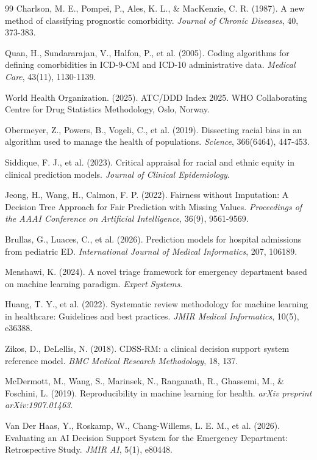 \documentclass[harvard,article]{frontiersinFPHY_FAMS}
\begin{document}
\begin{thebibliography}{99}
 Charlson, M. E., Pompei, P., Ales, K. L., \& MacKenzie, C. R. (1987). A new method of classifying prognostic comorbidity. \textit{Journal of Chronic Diseases}, 40, 373-383.

 Quan, H., Sundararajan, V., Halfon, P., et al. (2005). Coding algorithms for defining comorbidities in ICD-9-CM and ICD-10 administrative data. \textit{Medical Care}, 43(11), 1130-1139.

 World Health Organization. (2025). ATC/DDD Index 2025. WHO Collaborating Centre for Drug Statistics Methodology, Oslo, Norway.

 Obermeyer, Z., Powers, B., Vogeli, C., et al. (2019). Dissecting racial bias in an algorithm used to manage the health of populations. \textit{Science}, 366(6464), 447-453.

 Siddique, F. J., et al. (2023). Critical appraisal for racial and ethnic equity in clinical prediction models. \textit{Journal of Clinical Epidemiology}.

 Jeong, H., Wang, H., Calmon, F. P. (2022). Fairness without Imputation: A Decision Tree Approach for Fair Prediction with Missing Values. \textit{Proceedings of the AAAI Conference on Artificial Intelligence}, 36(9), 9561-9569.

 Brullas, G., Luaces, C., et al. (2026). Prediction models for hospital admissions from pediatric ED. \textit{International Journal of Medical Informatics}, 207, 106189.

 Menshawi, K. (2024). A novel triage framework for emergency department based on machine learning paradigm. \textit{Expert Systems}.

 Huang, T. Y., et al. (2022). Systematic review methodology for machine learning in healthcare: Guidelines and best practices. \textit{JMIR Medical Informatics}, 10(5), e36388.

 Zikos, D., DeLellis, N. (2018). CDSS-RM: a clinical decision support system reference model. \textit{BMC Medical Research Methodology}, 18, 137.

 McDermott, M., Wang, S., Marinsek, N., Ranganath, R., Ghassemi, M., \& Foschini, L. (2019). Reproducibility in machine learning for health. \textit{arXiv preprint arXiv:1907.01463}.

 Van Der Haas, Y., Roskamp, W., Chang-Willems, L. E. M., et al. (2026). Evaluating an AI Decision Support System for the Emergency Department: Retrospective Study. \textit{JMIR AI}, 5(1), e80448.


\end{thebibliography}
\end{document}
